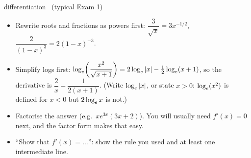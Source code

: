 \begin{example}{differentiation \byhand\ (typical Exam 1)}
\renewcommand{\arraystretch}{1.95}
\end{example}

\begin{tip}
\begin{itemize}
  \item Rewrite roots and fractions as powers first: $\dfrac{3}{\sqrt x}=3x^{-1/2}$, \ $\dfrac{2}{(1-x)^3}=2(1-x)^{-3}$.
  \item Simplify logs first: $\log_e\!\left(\dfrac{x^2}{\sqrt{x+1}}\right)=2\log_e|x|-\frac12\log_e(x+1)$, so the derivative is $\dfrac2x-\dfrac{1}{2(x+1)}$. (Write $\log_e|x|$, or state $x>0$: $\log_e(x^2)$ is defined for $x<0$ but $2\log_e x$ is not.)
  \item Factorise the answer (e.g.\ $xe^{3x}(3x+2)$). You will usually need $f'(x)=0$ next, and the factor form makes that easy.
  \item ``Show that $f'(x)=\dots$'': show the rule you used and at least one intermediate line.
\end{itemize}
\end{tip}

